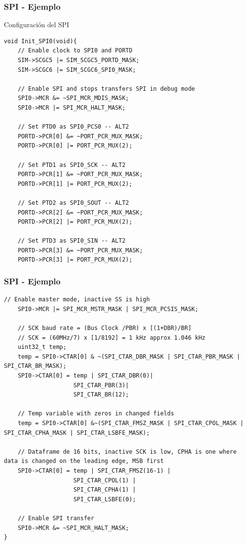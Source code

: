 \documentclass[10.5pt,scale=1.0,t,aspectratio=169,hyperref={pdfpagelabels=false}]{beamer}
\begin{document}
\begin{frame}[fragile]
	\frametitle{SPI - Ejemplo}
	{\small
		
	Configuración del SPI
		
		\begin{lstlisting}[style=CStyle]
void Init_SPI0(void){
	// Enable clock to SPI0 and PORTD
	SIM->SCGC5 |= SIM_SCGC5_PORTD_MASK;
	SIM->SCGC6 |= SIM_SCGC6_SPI0_MASK;
	
	// Enable SPI and stops transfers SPI in debug mode
	SPI0->MCR &= ~SPI_MCR_MDIS_MASK;
	SPI0->MCR |= SPI_MCR_HALT_MASK;
	
	// Set PTD0 as SPI0_PCS0 -- ALT2
	PORTD->PCR[0] &= ~PORT_PCR_MUX_MASK;
	PORTD->PCR[0] |= PORT_PCR_MUX(2);
	
	// Set PTD1 as SPI0_SCK -- ALT2
	PORTD->PCR[1] &= ~PORT_PCR_MUX_MASK;
	PORTD->PCR[1] |= PORT_PCR_MUX(2);
	
	// Set PTD2 as SPI0_SOUT -- ALT2
	PORTD->PCR[2] &= ~PORT_PCR_MUX_MASK;
	PORTD->PCR[2] |= PORT_PCR_MUX(2);
	
	// Set PTD3 as SPI0_SIN -- ALT2
	PORTD->PCR[3] &= ~PORT_PCR_MUX_MASK;
	PORTD->PCR[3] |= PORT_PCR_MUX(2);
		\end{lstlisting}	
	}
\end{frame}
\begin{frame}[fragile]
	\frametitle{SPI - Ejemplo}
	{\tiny
		\begin{lstlisting}[style=CStyle]
	// Enable master mode, inactive SS is high
	SPI0->MCR |= SPI_MCR_MSTR_MASK | SPI_MCR_PCSIS_MASK;
	
	// SCK baud rate = (Bus Clock /PBR) x [(1+DBR)/BR]
	// SCK = (60MHz/7) x [1/8192] = 1 kHz approx 1.046 kHz
	uint32_t temp;
	temp = SPI0->CTAR[0] & ~(SPI_CTAR_DBR_MASK | SPI_CTAR_PBR_MASK | SPI_CTAR_BR_MASK);
	SPI0->CTAR[0] = temp | SPI_CTAR_DBR(0)|
					SPI_CTAR_PBR(3)|
					SPI_CTAR_BR(12);
	
	// Temp variable with zeros in changed fields
	temp = SPI0->CTAR[0] &~(SPI_CTAR_FMSZ_MASK | SPI_CTAR_CPOL_MASK | SPI_CTAR_CPHA_MASK | SPI_CTAR_LSBFE_MASK);
	
	// Dataframe de 16 bits, inactive SCK is low, CPHA is one where data is changed on the leading edge, MSB first
	SPI0->CTAR[0] = temp | SPI_CTAR_FMSZ(16-1) |
					SPI_CTAR_CPOL(1) |
					SPI_CTAR_CPHA(1) |
					SPI_CTAR_LSBFE(0);
	
	// Enable SPI transfer
	SPI0->MCR &= ~SPI_MCR_HALT_MASK;
}
			
		\end{lstlisting}	
	}
\end{frame}
\end{document}
